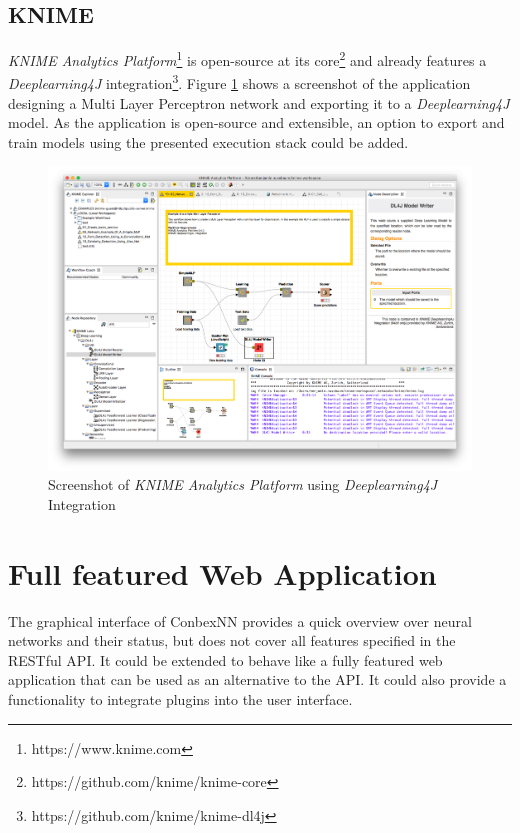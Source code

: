 \subsection{KNIME}\label{knime}

\emph{KNIME Analytics Platform}\footnote{https://www.knime.com} is
open-source at its core\footnote{https://github.com/knime/knime-core}
and already features a \emph{Deeplearning4J} integration\footnote{https://github.com/knime/knime-dl4j}.
Figure \ref{knime} shows a screenshot of the application designing a
Multi Layer Perceptron network and exporting it to a
\emph{Deeplearning4J} model. As the application is open-source and
extensible, an option to export and train models using the presented
execution stack could be added.

\begin{figure}
\centering
\includegraphics[width=17.00000cm]{images/knime}
\caption{Screenshot of \emph{KNIME Analytics Platform} using
\emph{Deeplearning4J} Integration \label{knime}}
\end{figure}

\section{Full featured Web
Application}\label{full-featured-web-application}

The graphical interface of ConbexNN provides a quick overview over
neural networks and their status, but does not cover all features
specified in the RESTful API. It could be extended to behave like a
fully featured web application that can be used as an alternative to the
API. It could also provide a functionality to integrate plugins into the
user interface.

